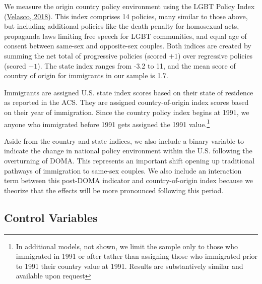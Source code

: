 \documentclass[
  11pt,
]{article}
\begin{document}
We measure the origin country policy environment using the LGBT Policy Index (\protect\hyperlink{ref-velasco_2018}{Velasco, 2018}). This index comprises 14 policies, many similar to those above, but including additional policies like the death penalty for homosexual acts, propaganda laws limiting free speech for LGBT communities, and equal age of consent between same-sex and opposite-sex couples. Both indices are created by summing the net total of progressive policies (scored \(+1\)) over regressive policies (scored \(-1\)). The state index ranges from -3.2 to 11, and the mean score of country of origin for immigrants in our sample is 1.7.

Immigrants are assigned U.S. state index scores based on their state of residence as reported in the ACS. They are assigned country-of-origin index scores based on their year of immigration. Since the country policy index begins at 1991, we anyone who immigrated before 1991 gets assigned the 1991 value.\footnote{In additional models, not shown, we limit the sample only to those who immigrated in 1991 or after tather than assigning those who immigrated prior to 1991 their country value at 1991. Results are substantively similar and available upon request}

Aside from the country and state indices, we also include a binary variable to indicate the change in national policy environment within the U.S. following the overturning of DOMA. This represents an important shift opening up traditional pathways of immigration to same-sex couples. We also include an interaction term between this post-DOMA indicator and country-of-origin index because we theorize that the effects will be more pronounced following this period.

\hypertarget{control-variables}{%
\subsection{Control Variables}\label{control-variables}}
\end{document}
